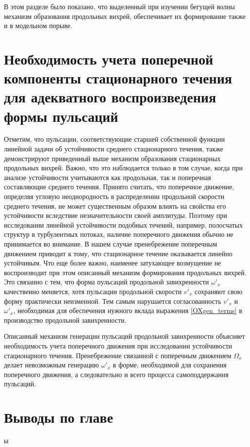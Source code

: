 В этом разделе было показано, что выделенный при изучении бегущей волны механизм образования продольных вихрей, обеспечивает их формирование также и в модельном порыве. 


\section{Необходимость учета поперечной компоненты стационарного течения для адекватного воспроизведения формы пульсаций}

Отметим, что пульсации, соответствующие старшей собственной функции линейной задачи об устойчивости среднего стационарного течения, также демонстрируют приведенный выше механизм образования стационарных продольных вихрей. Важно, что это наблюдается только в том случае, когда при анализе устойчивости учитываются как продольная, так и поперечная составляющие среднего течения. Принято считать, что поперечное движение, определяя угловую неоднородность в распределении продольной скорости среднего течения, не может существенным образом влиять на свойства его устойчивости вследствие незначительности своей амплитуды. Поэтому при исследовании линейной устойчивости подобных течений, например, полосчатых структур в турбулентных потоках, наличие поперечного движения обычно не принимается во внимание. В нашем случае пренебрежение поперечным движением приводит к тому, что стационарное течение оказывается линейно устойчивым. Что еще более важно, наименее затухающее возмущение не воспроизводит при этом описанный механизм формирования продольных вихрей. Это связанно с тем, что форма пульсаций продольной завихренности $\omega'_x$ качественно меняется, хотя пульсации продольной скорости $v'_x$ сохраняют свою форму практически неизменной. Тем самым нарушается согласованность  $v'_x$ и $\omega'_x$, необходимая для обеспечения нужного вклада выражения \eqref{OXgen_terms} в производство продольной завихренности.


Описанный механизм генерации пульсаций продольной завихренности объясняет необходимость учета поперечного движения при исследовании устойчивости стационарного течения. Пренебрежение связанной с поперечным движением $\Omega_x$ делает невозможным генерацию $\omega'_x$ в форме, необходимой для сохранения поперечного движения, а следовательно и всего процесса самоподдержания пульсаций.


\section{Выводы по главе}

ы
